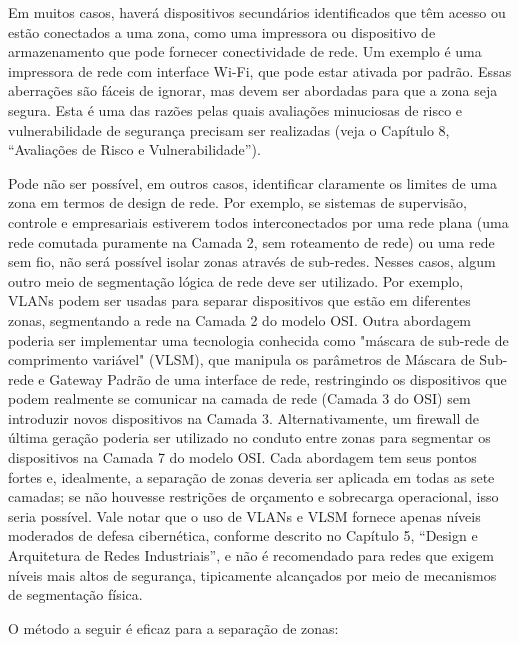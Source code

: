 Em muitos casos, haverá dispositivos secundários identificados que têm acesso ou estão conectados a uma zona, como uma impressora ou dispositivo de armazenamento que pode fornecer conectividade de rede. Um exemplo é uma impressora de rede com interface Wi-Fi, que pode estar ativada por padrão. Essas aberrações são fáceis de ignorar, mas devem ser abordadas para que a zona seja segura. Esta é uma das razões pelas quais avaliações minuciosas de risco e vulnerabilidade de segurança precisam ser realizadas (veja o Capítulo 8, “Avaliações de Risco e Vulnerabilidade”).

Pode não ser possível, em outros casos, identificar claramente os limites de uma zona em termos de design de rede. Por exemplo, se sistemas de supervisão, controle e empresariais estiverem todos interconectados por uma rede plana (uma rede comutada puramente na Camada 2, sem roteamento de rede) ou uma rede sem fio, não será possível isolar zonas através de sub-redes. Nesses casos, algum outro meio de segmentação lógica de rede deve ser utilizado. Por exemplo, VLANs podem ser usadas para separar dispositivos que estão em diferentes zonas, segmentando a rede na Camada 2 do modelo OSI. Outra abordagem poderia ser implementar uma tecnologia conhecida como "máscara de sub-rede de comprimento variável" (VLSM), que manipula os parâmetros de Máscara de Sub-rede e Gateway Padrão de uma interface de rede, restringindo os dispositivos que podem realmente se comunicar na camada de rede (Camada 3 do OSI) sem introduzir novos dispositivos na Camada 3. Alternativamente, um firewall de última geração poderia ser utilizado no conduto entre zonas para segmentar os dispositivos na Camada 7 do modelo OSI. Cada abordagem tem seus pontos fortes e, idealmente, a separação de zonas deveria ser aplicada em todas as sete camadas; se não houvesse restrições de orçamento e sobrecarga operacional, isso seria possível. Vale notar que o uso de VLANs e VLSM fornece apenas níveis moderados de defesa cibernética, conforme descrito no Capítulo 5, “Design e Arquitetura de Redes Industriais”, e não é recomendado para redes que exigem níveis mais altos de segurança, tipicamente alcançados por meio de mecanismos de segmentação física.

O método a seguir é eficaz para a separação de zonas:


